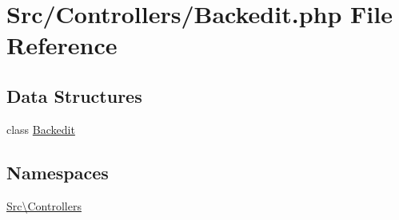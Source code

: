 \hypertarget{_backedit_8php}{}\section{Src/\+Controllers/\+Backedit.php File Reference}
\label{_backedit_8php}
\subsection*{Data Structures}
\begin{DoxyCompactItemize}
\item 
class \hyperlink{class_src_1_1_controllers_1_1_backedit}{Backedit}
\end{DoxyCompactItemize}
\subsection*{Namespaces}
\begin{DoxyCompactItemize}
\item 
 \hyperlink{namespace_src_1_1_controllers}{Src\textbackslash{}\+Controllers}
\end{DoxyCompactItemize}
